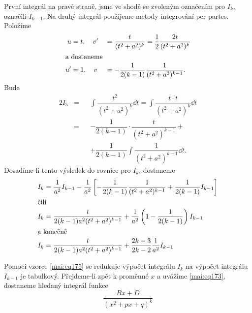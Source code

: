       První integrál na pravé straně, jsme ve shodě se zvoleným označením pro \(I_k\), označili
      \(I_{k-1}\). Na druhý integrál použijeme metody integrování per partes. Položíme 
      \begin{alignat*}{2}
        u  &= t, \quad v' &&=   \dfrac{t}{(t^2+a^2)^k} = \dfrac{1}{2}\dfrac{2t}{(t^2+a^2)^k}   \\
        \shortintertext{a dostaneme}
        u' &= 1, \quad v  &&= - \dfrac{1}{2(k-1)}\dfrac{1}{(t^2+a^2)^{k-1}}.
      \end{alignat*}
      Bude
      \begin{alignat}{2}
        I_5 &=  &&{} \int\dfrac{t^2}{(t^2+a^2)^k}\dd{t} =
                     \int\dfrac{t\cdot t}{(t^2+a^2)^k}\dd{t}                 \nonumber \\
            &=  &&-  \dfrac{1}{2(k-1)}\cdot\dfrac{t}{(t^2+a^2)^{k-1}} +      \nonumber \\
            &{} &&+  \dfrac{1}{2(k-1)}\int\dfrac{1}{(t^2+a^2)^{k-1}}\dd{t}.  \label{mai:eq174}
      \end{alignat}
      Dosadíme-li tento výsledek do rovnice pro \(I_k\), dostaneme
      \begin{gather}
        \begin{aligned}
        I_k &= \dfrac{1}{a^2}I_{k-1} - \dfrac{1}{a^2}
              \left[
                -\dfrac{1}{2(k-1)}\dfrac{1}{(t^2+a^2)^{k-1}} + \dfrac{1}{2(k-1)}I_{k-1}                
              \right]                                                                            \\
        \shortintertext{čili}     
        I_k &= \dfrac{t}{2(k-1)a^2(t^2+a^2)^{k-1}} + 
               \dfrac{1}{a^2}\left(1-\dfrac{1}{2(k-1)}\right)I_{k-1}                    \nonumber \\               
        \shortintertext{a konečně}
        I_k &= \dfrac{t}{2(k-1)a^2(t^2+a^2)^{k-1}} + 
              \dfrac{2k-3}{2k-2}\dfrac{1}{a^2}I_{k-1}                              \label{mai:eq175}
      \end{aligned}  
    \end{gather}

      Pomocí vzorce \ref{mai:eq175} se redukuje výpočet integrálu \(I_k\) na výpočet integrálu
      \(I_{k-1}\) je tabulkový. Přejdeme-li zpět k proměnné \(x\) a uvážíme \ref{mai:eq173},
      dostaneme hledaný integrál funkce
      \begin{equation*}
        \dfrac{Bx + D}{(x^2+px+q)^k}
      \end{equation*}

